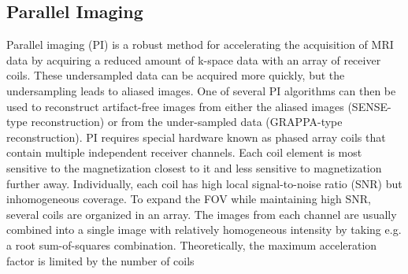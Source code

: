 \documentclass[english,version-2022-01]{uzl-thesis} %
\begin{document}
\subsection{Parallel Imaging}
Parallel imaging (PI) is a robust method for accelerating the acquisition of MRI data by acquiring a reduced amount of k-space data with an array of receiver coils. These undersampled data can be acquired more quickly, but the undersampling leads to aliased images. One of several PI algorithms can then be used to reconstruct artifact-free images from either the aliased images (SENSE-type reconstruction) or from the under-sampled data (GRAPPA-type reconstruction). PI requires special hardware known as phased array coils that 
contain multiple independent receiver channels. Each coil element is most sensitive to the magnetization closest to it and less sensitive to magnetization further away. 
Individually, each coil has high local signal-to-noise ratio (SNR) but inhomogeneous coverage. To expand the FOV while maintaining high SNR, several coils are organized in an array. The images from each channel are usually combined into a single image with relatively homogeneous intensity by taking e.g. a root sum-of-squares combination.
Theoretically, the maximum acceleration factor is limited by the number of coils
\end{document}
